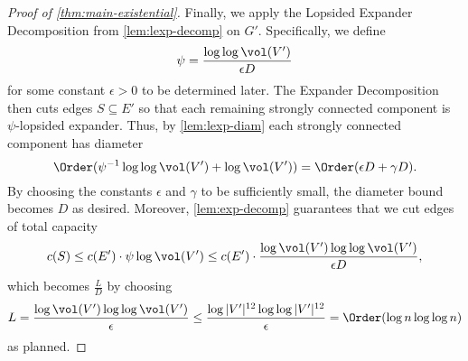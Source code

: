 \begin{proof}[Proof of \cref{thm:main-existential}]
Finally, we apply the Lopsided Expander Decomposition from \cref{lem:lexp-decomp} on $G'$. Specifically, we define
\begin{equation*}
	\psi = \frac{\log\log \vol(V')}{\epsilon D}
\end{equation*}
for some constant $\epsilon > 0$ to be determined later. The Expander Decomposition then cuts edges $S \subseteq E'$ so that each remaining strongly connected component is $\psi$-lopsided expander. Thus, by \cref{lem:lexp-diam} each strongly connected component has diameter
\begin{equation*}
	\Order(\psi^{-1} \log\log \vol(V') + \log \vol(V')) = \Order(\epsilon D + \gamma D).
\end{equation*}
By choosing the constants $\epsilon$ and $\gamma$ to be sufficiently small, the diameter bound becomes $D$ as desired. Moreover, \cref{lem:exp-decomp} guarantees that we cut edges of total capacity
\begin{equation*}
	c(S) \leq c(E') \cdot \psi \log \vol(V') \leq c(E') \cdot \frac{\log \vol(V') \log\log \vol(V')}{\epsilon D},
\end{equation*}
which becomes $\frac{L}{D}$ by choosing
\begin{equation*}
	L = \frac{\log \vol(V') \log\log \vol(V')}{\epsilon} \leq \frac{\log |V'|^{12} \log\log |V'|^{12}}{\epsilon} = \Order(\log n \log\log n)
\end{equation*}
as planned.
\end{proof}